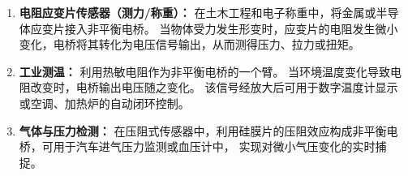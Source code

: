 \documentclass{../template/Report}%
\begin{document}
\begin{fullreportonly}
    \begin{enumerate}
        \item \textbf{电阻应变片传感器（测力/称重）：}
              在土木工程和电子称重中，将金属或半导体应变片接入非平衡电桥。
              当物体受力发生形变时，应变片的电阻发生微小变化，电桥将其转化为电压信号输出，从而测得压力、拉力或扭矩。
        \item \textbf{工业测温：}
              利用热敏电阻作为非平衡电桥的一个臂。
              当环境温度变化导致电阻改变时，电桥输出电压随之变化。
              该信号经放大后可用于数字温度计显示或空调、加热炉的自动闭环控制。
        \item \textbf{气体与压力检测：}
              在压阻式传感器中，利用硅膜片的压阻效应构成非平衡电桥，可用于汽车进气压力监测或血压计中，
              实现对微小气压变化的实时捕捉。
    \end{enumerate}
\end{fullreportonly}
\insertnotes
\end{document}

